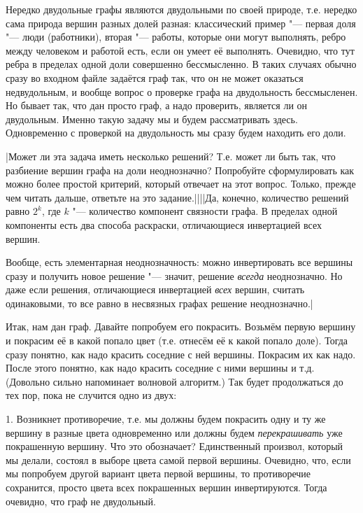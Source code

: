 Нередко двудольные графы являются двудольными по 
своей природе, т.е. нередко сама природа вершин разных долей разная: классический пример "--- 
первая доля "--- люди (работники), вторая "--- работы, которые они могут выполнять, ребро между 
человеком и работой есть, если он умеет её выполнять. Очевидно, что тут ребра в пределах одной доли 
совершенно бессмысленно. В таких случаях обычно сразу во входном файле задаётся граф так, что он не 
может оказаться недвудольным, и вообще вопрос о проверке графа на двудольность бессмысленен. Но 
бывает так, что дан просто граф, а надо проверить, является ли он двудольным. Именно такую задачу мы 
и будем рассматривать здесь. Одновременно с проверкой на двудольность мы сразу будем находить его 
доли. 

\task|Может ли эта задача иметь несколько решений? Т.е. может ли быть так, что 
разбиение вершин графа на доли неоднозначно? Попробуйте сформулировать как можно более простой 
критерий, который отвечает на этот вопрос. Только, прежде чем читать дальше, ответьте на это 
задание.||||Да, конечно, количество решений равно $2^k$, где $k$ "--- количество компонент связности графа.
В пределах одной компоненты есть два способа раскраски, отличающиеся инвертацией всех вершин. 

Вообще, есть элементарная неоднозначность: можно инвертировать все вершины сразу и получить новое решение "---
значит, решение \textit{всегда} неоднозначно. Но даже если решения, отличающиеся инвертацией \textit{всех} вершин, 
считать одинаковыми, то все равно в несвязных графах решение неоднозначно.|\label{ambigousbi}

Итак, нам дан граф. Давайте попробуем его покрасить. Возьмём первую вершину и покрасим её в какой 
попало цвет (т.е. отнесём её к какой попало доле). Тогда сразу понятно, как надо красить соседние с 
ней вершины. Покрасим их как надо. После этого понятно, как надо красить соседние с ними вершины и 
т.д. (Довольно сильно напоминает волновой алгоритм.) Так будет продолжаться до тех пор, пока не 
случится одно из двух:

1. Возникнет противоречие, т.е. мы должны будем покрасить одну и ту же вершину в разные цвета 
одновременно или должны будем \textit{перекрашивать} уже покрашенную вершину. Что это обозначает? 
Единственный произвол, который мы делали, состоял в выборе цвета самой первой вершины. Очевидно, 
что, если мы попробуем другой вариант цвета первой вершины, то противоречие сохранится, просто 
цвета всех покрашенных вершин инвертируются. Тогда очевидно, что граф не двудольный.

